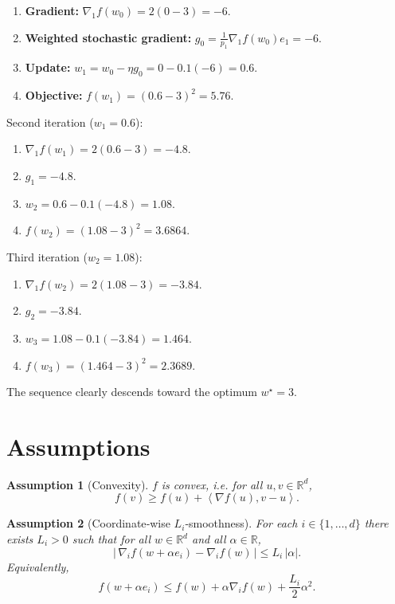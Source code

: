 \documentclass{article}
\newtheorem{assumption}{Assumption}
\newcommand{\R}{\mathbb{R}}
\newcommand{\ip}[2]{\left\langle #1,#2\right\rangle}
\begin{document}
\begin{enumerate}[label=Iteration \arabic*:, leftmargin=*]
\item \textbf{Gradient:} $\nabla_1 f(w_0)=2(0-3)=-6$.
\item \textbf{Weighted stochastic gradient:}
      $g_0=\frac{1}{p_1}\nabla_1 f(w_0)e_1=-6$.
\item \textbf{Update:} $w_1= w_0-\eta g_0 =0-0.1(-6)=0.6$.
\item \textbf{Objective:} $f(w_1)=(0.6-3)^2=5.76$.
\end{enumerate}

Second iteration ($w_1=0.6$):
\begin{enumerate}[label=Iteration \arabic*:, start=2, leftmargin=*]
\item $\nabla_1 f(w_1)=2(0.6-3)=-4.8$.
\item $g_1=-4.8$.
\item $w_2=0.6-0.1(-4.8)=1.08$.
\item $f(w_2)=(1.08-3)^2=3.6864$.
\end{enumerate}

Third iteration ($w_2=1.08$):
\begin{enumerate}[label=Iteration \arabic*:, start=3, leftmargin=*]
\item $\nabla_1 f(w_2)=2(1.08-3)=-3.84$.
\item $g_2=-3.84$.
\item $w_3=1.08-0.1(-3.84)=1.464$.
\item $f(w_3)=(1.464-3)^2=2.3689$.
\end{enumerate}
The sequence clearly descends toward the optimum $w^\star=3$.

\newpage
\section*{Assumptions}
\begin{assumption}[Convexity]\label{as:convex}
$f$ is convex, i.e. for all $u,v\in\R^{d}$,
\[
f(v)\ge f(u)+\ip{\nabla f(u)}{v-u}.
\]
\end{assumption}

\begin{assumption}[Coordinate‑wise $L_i$‑smoothness]\label{as:smooth}
For each $i\in\{1,\dots,d\}$ there exists $L_i>0$ such that for all $w\in\R^{d}$ and all
$\alpha\in\R$,
\[
\bigl|\,\nabla_i f(w+\alpha e_i)-\nabla_i f(w)\,\bigr|
   \le L_i\,|\alpha|.
\]
Equivalently,
\[
f(w+\alpha e_i)\le f(w)+\alpha \nabla_i f(w)+\frac{L_i}{2}\alpha^{2}.
\tag{2}
\]
\end{assumption}
\end{document}
